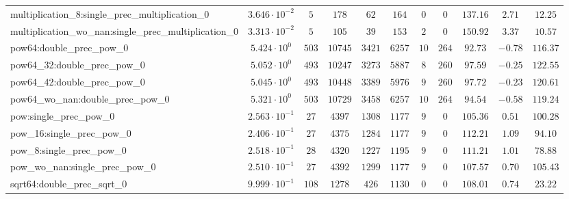 \begin{tabular}{|l|c|c|c|c|c|c|c|c|c|c|}
multiplication\_8:single\_prec\_multiplication\_0         & $ 3.646 \cdot 10^{-2} $ & $ 5      $ & $ 178    $ & $ 62    $ & $ 164   $ & $ 0   $ & $ 0    $ & $ 137.16      $ & $ 2.71    $ & $ 12.25   $ \\
multiplication\_wo\_nan:single\_prec\_multiplication\_0   & $ 3.313 \cdot 10^{-2} $ & $ 5      $ & $ 105    $ & $ 39    $ & $ 153   $ & $ 2   $ & $ 0    $ & $ 150.92      $ & $ 3.37    $ & $ 10.57   $ \\
pow64:double\_prec\_pow\_0                                & $ 5.424 \cdot 10^{0}  $ & $ 503    $ & $ 10745  $ & $ 3421  $ & $ 6257  $ & $ 10  $ & $ 264  $ & $ 92.73       $ & $ -0.78   $ & $ 116.37  $ \\
pow64\_32:double\_prec\_pow\_0                            & $ 5.052 \cdot 10^{0}  $ & $ 493    $ & $ 10247  $ & $ 3273  $ & $ 5887  $ & $ 8   $ & $ 260  $ & $ 97.59       $ & $ -0.25   $ & $ 122.55  $ \\
pow64\_42:double\_prec\_pow\_0                            & $ 5.045 \cdot 10^{0}  $ & $ 493    $ & $ 10448  $ & $ 3389  $ & $ 5976  $ & $ 9   $ & $ 260  $ & $ 97.72       $ & $ -0.23   $ & $ 120.61  $ \\
pow64\_wo\_nan:double\_prec\_pow\_0                       & $ 5.321 \cdot 10^{0}  $ & $ 503    $ & $ 10729  $ & $ 3458  $ & $ 6257  $ & $ 10  $ & $ 264  $ & $ 94.54       $ & $ -0.58   $ & $ 119.24  $ \\
pow:single\_prec\_pow\_0                                  & $ 2.563 \cdot 10^{-1} $ & $ 27     $ & $ 4397   $ & $ 1308  $ & $ 1177  $ & $ 9   $ & $ 0    $ & $ 105.36      $ & $ 0.51    $ & $ 100.28  $ \\
pow\_16:single\_prec\_pow\_0                              & $ 2.406 \cdot 10^{-1} $ & $ 27     $ & $ 4375   $ & $ 1284  $ & $ 1177  $ & $ 9   $ & $ 0    $ & $ 112.21      $ & $ 1.09    $ & $ 94.10   $ \\
pow\_8:single\_prec\_pow\_0                               & $ 2.518 \cdot 10^{-1} $ & $ 28     $ & $ 4320   $ & $ 1227  $ & $ 1195  $ & $ 9   $ & $ 0    $ & $ 111.21      $ & $ 1.01    $ & $ 78.88   $ \\
pow\_wo\_nan:single\_prec\_pow\_0                         & $ 2.510 \cdot 10^{-1} $ & $ 27     $ & $ 4392   $ & $ 1299  $ & $ 1177  $ & $ 9   $ & $ 0    $ & $ 107.57      $ & $ 0.70    $ & $ 105.43  $ \\
sqrt64:double\_prec\_sqrt\_0                              & $ 9.999 \cdot 10^{-1} $ & $ 108    $ & $ 1278   $ & $ 426   $ & $ 1130  $ & $ 0   $ & $ 0    $ & $ 108.01      $ & $ 0.74    $ & $ 23.22   $ \\

\end{tabular}

